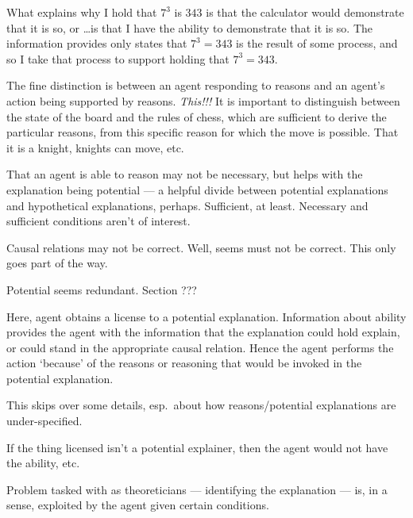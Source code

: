 \documentclass[10pt]{article}
\newcommand{\hozlinedash}[0]{%
  \noindent\hdashrule[0.5ex][c]{\textwidth}{.1pt}{2.5pt}
}
\begin{document}
What explains why I hold that \(7^{3}\) is \(343\) is that the calculator would demonstrate that it is so, or \dots is that I have the ability to demonstrate that it is so.
The information provides only states that \(7^{3} = 343\) is the result of some process, and so I take that process to support holding that \(7^{3} = 343\).


\begin{note}
  The fine distinction is between an agent responding to reasons and an agent's action being supported by reasons.
  {
    \color{red}
    \emph{This!!!}
  }
  It is important to distinguish between the state of the board and the rules of chess, which are sufficient to derive the particular reasons, from this specific reason for which the move is possible.
  That it is a knight, knights can move, etc.
\end{note}

\hozlinedash





That an agent is able to reason may not be necessary, but helps with the explanation being potential --- a helpful divide between potential explanations and hypothetical explanations, perhaps.
Sufficient, at least.
Necessary and sufficient conditions aren't of interest.


Causal relations may not be correct.
Well, seems must not be correct.
This only goes part of the way.

Potential seems redundant.
Section ???










Here, agent obtains a license to a potential explanation.
Information about ability provides the agent with the information that the explanation could hold explain, or could stand in the appropriate causal relation.
Hence the agent performs the action `because' of the reasons or reasoning that would be invoked in the potential explanation.

{
\color{red} This skips over some details, esp.\ about how reasons/potential explanations are under-specified.
}

If the thing licensed isn't a potential explainer, then the agent would not have the ability, etc.\

Problem tasked with as theoreticians --- identifying the explanation --- is, in a sense, exploited by the agent given certain conditions.
\end{document}
